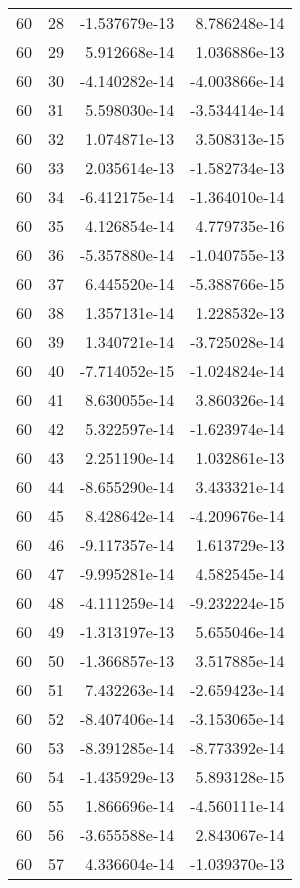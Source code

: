 \begin{tabular}{rrrr}
  60 &   28 & -1.537679e-13 &  8.786248e-14 \\
  60 &   29 &  5.912668e-14 &  1.036886e-13 \\
  60 &   30 & -4.140282e-14 & -4.003866e-14 \\
  60 &   31 &  5.598030e-14 & -3.534414e-14 \\
  60 &   32 &  1.074871e-13 &  3.508313e-15 \\
  60 &   33 &  2.035614e-13 & -1.582734e-13 \\
  60 &   34 & -6.412175e-14 & -1.364010e-14 \\
  60 &   35 &  4.126854e-14 &  4.779735e-16 \\
  60 &   36 & -5.357880e-14 & -1.040755e-13 \\
  60 &   37 &  6.445520e-14 & -5.388766e-15 \\
  60 &   38 &  1.357131e-14 &  1.228532e-13 \\
  60 &   39 &  1.340721e-14 & -3.725028e-14 \\
  60 &   40 & -7.714052e-15 & -1.024824e-14 \\
  60 &   41 &  8.630055e-14 &  3.860326e-14 \\
  60 &   42 &  5.322597e-14 & -1.623974e-14 \\
  60 &   43 &  2.251190e-14 &  1.032861e-13 \\
  60 &   44 & -8.655290e-14 &  3.433321e-14 \\
  60 &   45 &  8.428642e-14 & -4.209676e-14 \\
  60 &   46 & -9.117357e-14 &  1.613729e-13 \\
  60 &   47 & -9.995281e-14 &  4.582545e-14 \\
  60 &   48 & -4.111259e-14 & -9.232224e-15 \\
  60 &   49 & -1.313197e-13 &  5.655046e-14 \\
  60 &   50 & -1.366857e-13 &  3.517885e-14 \\
  60 &   51 &  7.432263e-14 & -2.659423e-14 \\
  60 &   52 & -8.407406e-14 & -3.153065e-14 \\
  60 &   53 & -8.391285e-14 & -8.773392e-14 \\
  60 &   54 & -1.435929e-13 &  5.893128e-15 \\
  60 &   55 &  1.866696e-14 & -4.560111e-14 \\
  60 &   56 & -3.655588e-14 &  2.843067e-14 \\
  60 &   57 &  4.336604e-14 & -1.039370e-13 \\

\end{tabular}
